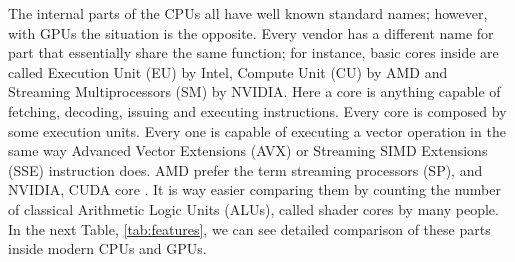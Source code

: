 \documentclass{article}
\begin{document}
The internal parts of the CPUs all have well known standard names;
however, with GPUs the situation is the opposite. Every vendor has a
different name for part that essentially share the same function; for
instance, basic cores %
inside are called Execution Unit (EU) by Intel, Compute Unit (CU) by
AMD and Streaming Multiprocessors (SM) by NVIDIA. Here a core is
anything capable of fetching, decoding, issuing and executing
instructions. Every core is composed by some execution units. Every one
is capable of executing a vector operation in the same way Advanced Vector Extensions (AVX) or Streaming SIMD Extensions (SSE) instruction does. AMD prefer the term streaming processors (SP), and
NVIDIA, CUDA core \cite{YangCUDA15}. It is way easier comparing them by counting the
number of classical Arithmetic Logic Units (ALUs), called shader cores
by many people. In the next Table, \ref{tab:features}, we can see
detailed comparison of these parts inside modern CPUs and GPUs.
\end{document}
